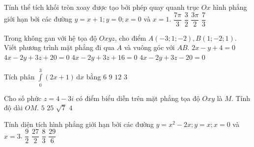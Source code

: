 	\begin{ex}%
		Tính thể tích khối tròn xoay được tạo bởi phép quay quanh trục $Ox$ hình phẳng giới hạn bởi các đường $y=x+1;y=0;x=0$ và $x=1$.	
		\choice
		{\True $\dfrac{7\pi}{3}$}
		{$\dfrac{3}{2}$}
		{$\dfrac{3\pi}{2}$}
		{$\dfrac{7}{3}$}
	\end{ex}
	\begin{ex}%
		Trong không gan với hệ tọa độ $Oxyz$, cho điểm $A(-3;1;-2), B(1;-2;1)$. Viết phương trình mặt phẳng đi qua $A$ và vuông góc với $AB$.		
		\choice
		{$2x-y+4=0$}
		{\True $4x-2y+3z+20=0$}
		{$4x-2y+3z+16=0$}
		{$4x-2y+3z-20=0$}
	\end{ex}
	\begin{ex}%
		Tích phân $\displaystyle\int\limits_{0}^{3}(2x+1)\mathrm{\,d}x$ bằng
		\choice
		{$6$}
		{$9$}
		{\True $12$}
		{$3$}
	\end{ex}
	\begin{ex}%
		Cho số phức $z=4-3i$ có điểm biểu diễn trên mặt phẳng tọa độ $Oxy$ là $M$. Tính độ dài $OM$.		
		\choice
		{\True $5$}
		{$25$}
		{$\sqrt{7}$}
		{$4$}
	\end{ex}
	\begin{ex}%
		Tính diện tích hình phẳng giới hạn bởi các đường $y=x^2-2x;y=x;x=0$ và $x=3$.
		\choice
		{\True $\dfrac{9}{2}$}
		{$\dfrac{27}{2}$}
		{$\dfrac{8}{3}$}
		{$\dfrac{29}{6}$}
	\end{ex}
